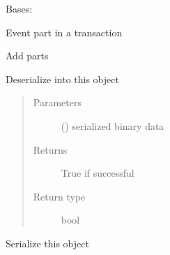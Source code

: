 \documentclass[letterpaper,10pt,english]{sphinxmanual}
\begin{document}
\begin{fulllineitems}
\label{\detokenize{bbc1.core.bbclib:bbc1.core.bbclib.BBcEvent}}
Bases: 

Event part in a transaction

\begin{fulllineitems}
\label{\detokenize{bbc1.core.bbclib:bbc1.core.bbclib.BBcEvent.add}}
Add parts

\end{fulllineitems}


\begin{fulllineitems}
\label{\detokenize{bbc1.core.bbclib:bbc1.core.bbclib.BBcEvent.deserialize}}
Deserialize into this object
\begin{quote}\begin{description}
\item[{Parameters}] \leavevmode
{} () \textendash{} serialized binary data

\item[{Returns}] \leavevmode
True if successful

\item[{Return type}] \leavevmode
bool

\end{description}\end{quote}

\end{fulllineitems}


\begin{fulllineitems}
\label{\detokenize{bbc1.core.bbclib:bbc1.core.bbclib.BBcEvent.serialize}}
Serialize this object

\end{fulllineitems}


\end{fulllineitems}
\end{document}
